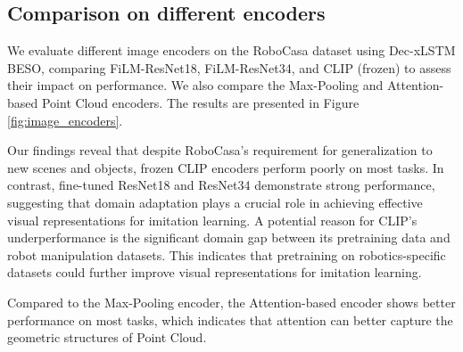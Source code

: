 \subsection{Comparison on different encoders}
We evaluate different image encoders on the RoboCasa dataset using Dec-xLSTM BESO, comparing FiLM-ResNet18, FiLM-ResNet34, and CLIP (frozen) to assess their impact on performance. We also compare the Max-Pooling and Attention-based Point Cloud encoders. The results are presented in Figure \ref{fig:image_encoders}.

Our findings reveal that despite RoboCasa's requirement for generalization to new scenes and objects, frozen CLIP encoders perform poorly on most tasks. In contrast, fine-tuned ResNet18 and ResNet34 demonstrate strong performance, suggesting that domain adaptation plays a crucial role in achieving effective visual representations for imitation learning. A potential reason for CLIP’s underperformance is 
the significant domain gap between its pretraining data and robot manipulation datasets. This indicates that pretraining on robotics-specific datasets could further improve visual representations for imitation learning.

Compared to the Max-Pooling encoder, the Attention-based encoder shows better performance on most tasks, which indicates that attention can better capture the geometric structures of Point Cloud.

% 




% 
